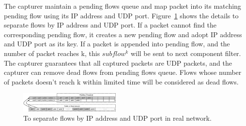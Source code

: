 \documentclass[conference]{IEEEtran}
\begin{document}


The capturer maintain a pending flows queue and map packet into its matching pending flow using its IP address and UDP port. Figure~\ref{fig:flow} shows the details to separate flows by IP address and UDP port. If a packet cannot find the corresponding pending flow, it creates a new pending flow and adopt IP address and UDP port as its key. If a packet is appended into pending flow, and the number of packet reaches k, this $subflow^k$ will be sent to next component filter. The capturer guarantees that all captured packets are UDP packets, and the capturer can remove dead flows from pending flows queue. Flows whose number of packets doesn't reach k within limited time will be considered as dead flows.

\begin{figure}[htp]
\begin{center}
\includegraphics[width=0.45\textwidth]{flow.eps}
\caption{To separate flows by IP address and UDP port in real network.}\label{fig:flow}
\end{center}
\end{figure}
\end{document}
